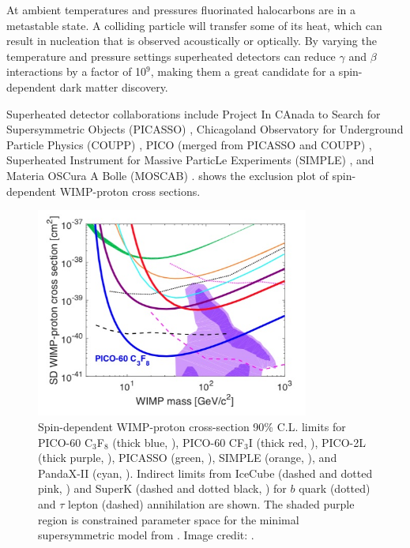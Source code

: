 At ambient temperatures and pressures fluorinated halocarbons are in a metastable state.  A colliding particle will transfer some of its
heat, which can result in nucleation that is observed acoustically or optically.  By varying the temperature and pressure settings
superheated detectors can reduce $\gamma$ and $\beta$ interactions by a factor of 10$^{9}$, making them a great candidate for a
spin-dependent dark matter discovery.

Superheated detector collaborations include Project In CAnada to Search for Supersymmetric Objects (PICASSO) ,
Chicagoland Observatory for Underground Particle Physics (COUPP) ,
PICO (merged from PICASSO and COUPP) , Superheated Instrument for Massive ParticLe Experiments (SIMPLE)
, and Materia OSCura A Bolle (MOSCAB) .   shows the exclusion plot of
spin-dependent WIMP-proton cross sections.


\begin{figure}
 \centering
 \includegraphics[width=0.8\textwidth]{spin_dependent_limits}
 \caption{Spin-dependent WIMP-proton cross-section 90\% C.L. limits for PICO-60 C$_{3}$F${_8}$ (thick blue, ), PICO-60
 CF$_{3}$I (thick red,
 ), PICO-2L (thick purple, ), PICASSO (green, ), SIMPLE (orange,
 ), and PandaX-II (cyan, ).  Indirect limits from IceCube
 (dashed and dotted pink, ) and SuperK (dashed and
 dotted black, ) for $b$ quark (dotted) and $\tau$ lepton (dashed)
 annihilation are shown.  The shaded purple region is constrained parameter space for the minimal
 supersymmetric model from .
 Image credit: .}
 \label{fig:sd_limits}
\end{figure}

